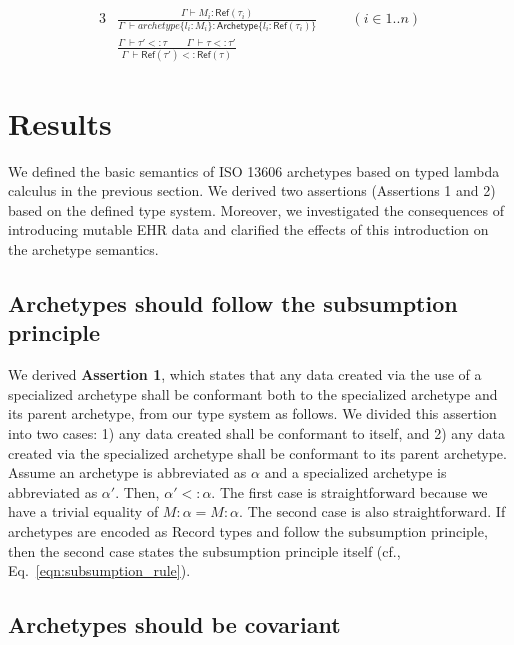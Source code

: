 \documentclass[preprint,3p,onecolumn,times,review]{elsarticle}
\begin{document}
\begin{alignat}{3}
  & \frac{\Gamma \vdash M_i : \mathsf{Ref}(\tau_i) }
         {\Gamma ~ \vdash archetype\{l_i: M_i\} : \mathsf{Archetype}\{l_i : \mathsf{Ref}(\tau_i) \} } \qquad  ~~(i \in 1..n) \label{eqn:mutable_record_field_reference}\\[6pt]
  & \frac{\Gamma ~ \vdash \tau' <: \tau \qquad \Gamma ~ \vdash \tau <: \tau'}
       {\Gamma ~ \vdash \mathsf{Ref(\tau')} <: \mathsf{Ref(\tau)}} \label{eqn:reference_subtyping}
\end{alignat}


\section{Results}

We defined the basic semantics of ISO 13606 archetypes based on typed lambda calculus in the previous section. We derived two assertions (Assertions 1 and 2) based on the defined type system. Moreover, we investigated the consequences of introducing mutable EHR data and clarified the effects of this introduction on the archetype semantics.

\subsection{Archetypes should follow the subsumption principle}

We derived {\bf Assertion 1}, which states that any data created via the use of a specialized archetype shall be conformant both to the specialized archetype and its parent archetype, from our type system as follows.
We divided this assertion into two cases: 1) any data created shall be conformant to itself, and 2) any data created via the specialized archetype shall be conformant to its parent archetype.
Assume an archetype is abbreviated as $\alpha$ and a specialized archetype is abbreviated as $\alpha'$. Then, $\alpha' <: \alpha$.
The first case is straightforward because we have a trivial equality of $M : \alpha = M : \alpha$.
The second case is also straightforward. If archetypes are encoded as Record types and follow the subsumption principle, then the second case states the subsumption principle itself (cf., Eq.~\ref{eqn:subsumption_rule}).


\subsection{Archetypes should be covariant}
\end{document}
